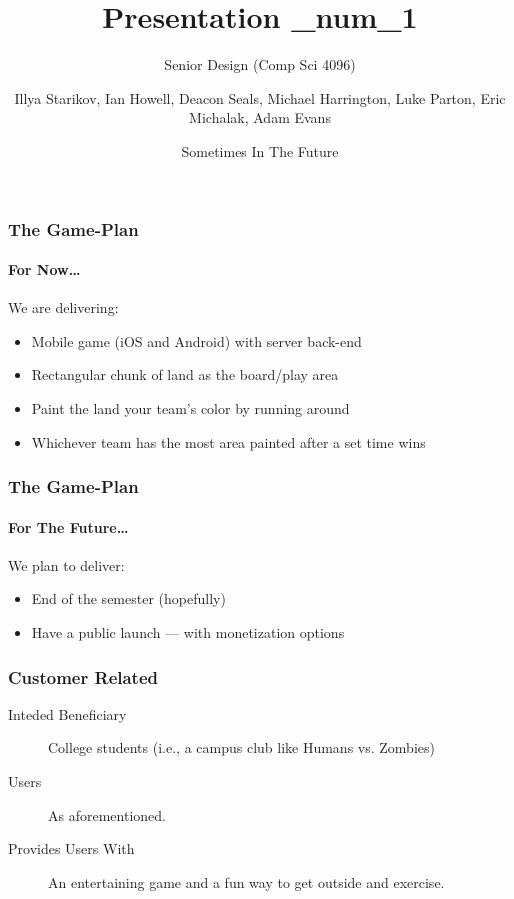 \documentclass[xclolor=dvipsnames]{beamer}            %
\title{Presentation \_num_1}
\subtitle{Senior Design (Comp Sci 4096)}
\author{Illya Starikov, Ian Howell, Deacon Seals, Michael Harrington, Luke Parton, Eric Michalak, Adam Evans}
\date{Sometimes In The Future}
\institute{Missouri University of Science and Technology}
\begin{document}
\begin{darkframes}
    \maketitle


    \begin{frame}
        \frametitle{The Game-Plan}
        \framesubtitle{For Now\ldots}
        We are delivering:

        \begin{itemize}
            \item Mobile game (iOS and Android) with server back-end
            \item Rectangular chunk of land as the board/play area
            \item Paint the land your team's color by running around
            \item Whichever team has the most area painted after a set time wins
        \end{itemize}

    \end{frame}


    \begin{frame}
        \frametitle{The Game-Plan}
        \framesubtitle{For The Future\ldots}

        We plan to deliver:

        \begin{itemize}
            \item End of the semester (hopefully)
            \item Have a public launch --- with monetization options
        \end{itemize}

    \end{frame}


    \begin{frame}
        \frametitle{Customer Related}

        \begin{description}
            \item[Inteded Beneficiary] College students (i.e., a campus club like Humans vs. Zombies)
            \item[\phantom{Placeholder---} Users]           As aforementioned.
            \item[Provides Users With] An entertaining game and a fun way to get outside and exercise.
        \end{description}


\end{frame}
\end{darkframes}
\end{document}
